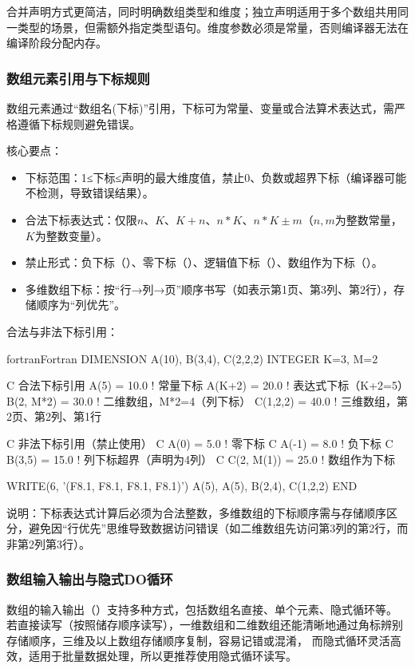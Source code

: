 合并声明方式更简洁，同时明确数组类型和维度；独立声明适用于多个数组共用同一类型的场景，但需额外指定类型语句。维度参数必须是常量，否则编译器无法在编译阶段分配内存。

\subsubsection{数组元素引用与下标规则}
数组元素通过“数组名(下标)”引用，下标可为常量、变量或合法算术表达式，需严格遵循下标规则避免错误。

核心要点：
\begin{itemize}
      \item 下标范围：1≤下标≤声明的最大维度值，禁止0、负数或超界下标（编译器可能不检测，导致错误结果）。
      \item 合法下标表达式：仅限\(n\)、\(K\)、\(K+n\)、\(n*K\)、\(n*K±m\)（\(n,m\)为整数常量，\(K\)为整数变量）。
      \item 禁止形式：负下标（）、零下标（）、逻辑值下标（）、数组作为下标（）。
      \item 多维数组下标：按“行→列→页”顺序书写（如表示第1页、第3列、第2行），存储顺序为“列优先”。
\end{itemize}

合法与非法下标引用：
\begin{envcode}{fortran}{Fortran}
      DIMENSION A(10), B(3,4), C(2,2,2)
      INTEGER K=3, M=2
      
C 合法下标引用
      A(5) = 10.0        ! 常量下标
      A(K+2) = 20.0      ! 表达式下标（K+2=5）
      B(2, M*2) = 30.0   ! 二维数组，M*2=4（列下标）
      C(1,2,2) = 40.0    ! 三维数组，第2页、第2列、第1行
      
C 非法下标引用（禁止使用）
C     A(0) = 5.0        ! 零下标
C     A(-1) = 8.0       ! 负下标
C     B(3,5) = 15.0     ! 列下标超界（声明为4列）
C     C(2, M(1)) = 25.0 ! 数组作为下标
      
      WRITE(6, '(F8.1, F8.1, F8.1, F8.1)') A(5), A(5), B(2,4), C(1,2,2)
      END
\end{envcode}

说明：下标表达式计算后必须为合法整数，多维数组的下标顺序需与存储顺序区分，避免因“行优先”思维导致数据访问错误（如二维数组先访问第3列的第2行，而非第2列第3行）。

\subsubsection{数组输入输出与隐式DO循环}
数组的输入输出（）支持多种方式，包括数组名直接、单个元素、隐式循环等。
若直接读写（按照储存顺序读写），一维数组和二维数组还能清晰地通过角标辨别存储顺序，三维及以上数组存储顺序复制，容易记错或混淆，
而隐式循环灵活高效，适用于批量数据处理，所以更推荐使用隐式循环读写。

